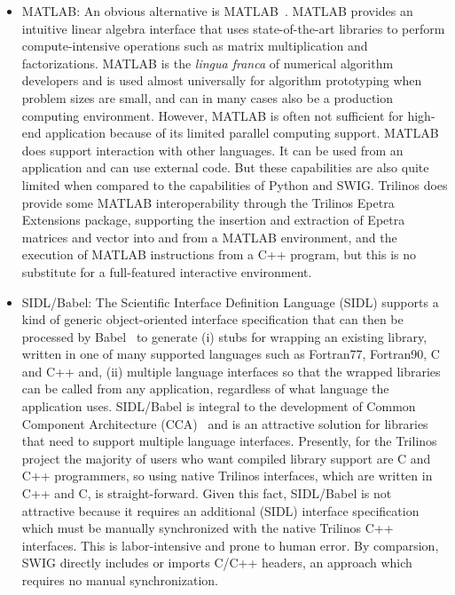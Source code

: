 \documentclass[acmtocl]{acmtrans2m}
\begin{document}
\begin{itemize}

\item MATLAB: An obvious alternative is
  MATLAB~\cite{Matlab-home-page}.  MATLAB provides an intuitive linear
  algebra interface that uses state-of-the-art libraries to perform
  compute-intensive operations such as matrix multiplication and
  factorizations.  MATLAB is the {\it lingua franca} of numerical
  algorithm developers and is used almost universally for algorithm
  prototyping when problem sizes are small, and can in many cases also
  be a production computing environment. However, MATLAB is often not
  sufficient for high-end application because of its limited parallel
  computing support.  MATLAB does support interaction with other
  languages.  It can be used from an application and can use external
  code.  But these capabilities are also quite limited when compared
  to the capabilities of Python and SWIG.  Trilinos does provide some
  MATLAB interoperability through the Trilinos Epetra Extensions
  package, supporting the insertion and extraction of Epetra matrices
  and vector into and from a MATLAB environment, and the execution of
  MATLAB instructions from a C++ program, but this is no substitute
  for a full-featured interactive environment.

\item SIDL/Babel: The Scientific Interface Definition Language (SIDL)
  supports a kind of generic object-oriented interface specification
  that can then be processed by Babel~\cite{Babel-home-page} to
  generate (i) stubs for wrapping an existing library, written in one
  of many supported languages such as Fortran77, Fortran90, C and C++
  and, (ii) multiple language interfaces so that the wrapped libraries
  can be called from any application, regardless of what language the
  application uses.  SIDL/Babel is integral to the development of
  Common Component Architecture (CCA)~\cite{cca} and is an attractive
  solution for libraries that need to support multiple language
  interfaces.  Presently, for the Trilinos project the majority of
  users who want compiled library support are C and C++ programmers,
  so using native Trilinos interfaces, which are written in C++ and C,
  is straight-forward.  Given this fact, SIDL/Babel is not attractive
  because it requires an additional (SIDL) interface specification
  which must be manually synchronized with the native Trilinos C++
  interfaces.  This is labor-intensive and prone to human error.  By
  comparsion, SWIG directly includes or imports C/C++ headers, an
  approach which requires no manual synchronization.

\end{itemize}
\end{document}
